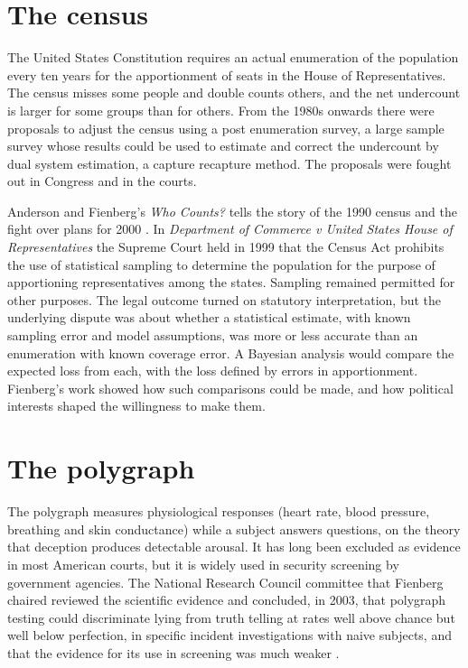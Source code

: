 \section{The census}

The United States Constitution requires an actual enumeration of the population every ten years for the apportionment of seats in the House of Representatives. The census misses some people and double counts others, and the net undercount is larger for some groups than for others. From the 1980s onwards there were proposals to adjust the census using a post enumeration survey, a large sample survey whose results could be used to estimate and correct the undercount by dual system estimation, a capture recapture method. The proposals were fought out in Congress and in the courts.

Anderson and Fienberg's \emph{Who Counts?} tells the story of the 1990 census and the fight over plans for 2000 \citep{anderson1999}. In \emph{Department of Commerce v United States House of Representatives} the Supreme Court held in 1999 that the Census Act prohibits the use of statistical sampling to determine the population for the purpose of apportioning representatives among the states. Sampling remained permitted for other purposes. The legal outcome turned on statutory interpretation, but the underlying dispute was about whether a statistical estimate, with known sampling error and model assumptions, was more or less accurate than an enumeration with known coverage error. A Bayesian analysis would compare the expected loss from each, with the loss defined by errors in apportionment. Fienberg's work showed how such comparisons could be made, and how political interests shaped the willingness to make them.

\section{The polygraph}

The polygraph measures physiological responses (heart rate, blood pressure, breathing and skin conductance) while a subject answers questions, on the theory that deception produces detectable arousal. It has long been excluded as evidence in most American courts, but it is widely used in security screening by government agencies. The National Research Council committee that Fienberg chaired reviewed the scientific evidence and concluded, in 2003, that polygraph testing could discriminate lying from truth telling at rates well above chance but well below perfection, in specific incident investigations with naive subjects, and that the evidence for its use in screening was much weaker \citep{nrc2003}.

